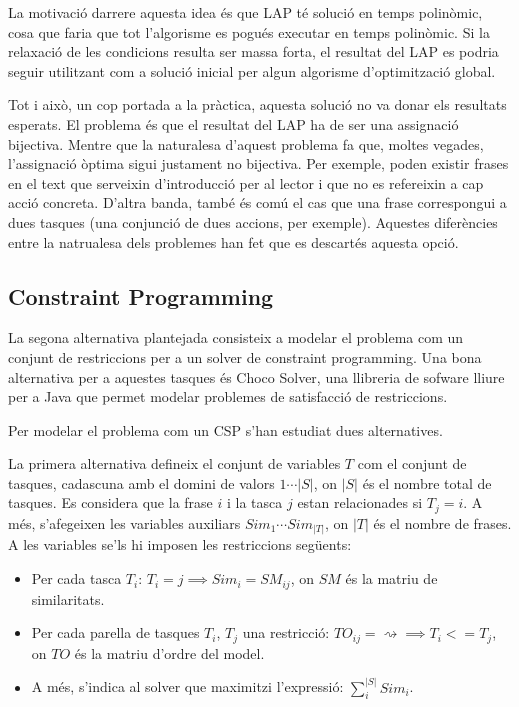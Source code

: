 La motivació darrere aquesta idea és que LAP té solució en temps polinòmic, cosa que faria que tot l'algorisme es pogués executar en temps polinòmic. Si la relaxació de les condicions resulta ser massa forta, el resultat del LAP es podria seguir utilitzant com a solució inicial per algun algorisme d'optimització global.

Tot i això, un cop portada a la pràctica, aquesta solució no va donar els resultats esperats. El problema és que el resultat del LAP ha de ser una assignació bijectiva. Mentre que la naturalesa d'aquest problema fa que, moltes vegades, l'assignació òptima sigui justament no bijectiva. Per exemple, poden existir frases en el text que serveixin d'introducció per al lector i que no es refereixin a cap acció concreta. D'altra banda, també és comú el cas que una frase correspongui a dues tasques (una conjunció de dues accions, per exemple). Aquestes diferències entre la natrualesa dels problemes han fet que es descartés aquesta opció.

\subsection{Constraint Programming}
\label{sec:implementacio-cp}

La segona alternativa plantejada consisteix a modelar el problema com un conjunt de restriccions per a un solver de constraint programming\cite{CP}. Una bona alternativa per a aquestes tasques és Choco Solver, una llibreria de sofware lliure per a Java que permet modelar problemes de satisfacció de restriccions.

Per modelar el problema com un CSP s'han estudiat dues alternatives.

La primera alternativa defineix el conjunt de variables $T$ com el conjunt de tasques, cadascuna amb el domini de valors $1 \cdots |S|$, on $|S|$ és el nombre total de tasques. Es considera que la frase $i$ i la tasca $j$ estan relacionades si $T_j = i$. A més, s'afegeixen les variables auxiliars $Sim_1 \cdots Sim_{|T|}$, on $|T|$ és el nombre de frases. A les variables se'ls hi imposen les restriccions següents: 
\begin{itemize}
    \item Per cada tasca $T_i$: $T_i = j \implies Sim_i = SM_{ij}$, on $SM$ és la matriu de similaritats.
    \item Per cada parella de tasques $T_i$, $T_j$ una restricció: $TO_{ij} = \rightsquigarrow \implies T_i <= T_j$, on $TO$ és la matriu d'ordre del model. 
    \item A més, s'indica al solver que maximitzi l'expressió: $\sum_i^{|S|}{Sim_i}$.
\end{itemize}

